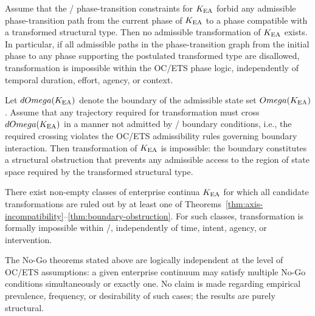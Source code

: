 \begin{theorem}
\label{thm:phase-incompatibility}
Assume that the \OC/ phase-transition constraints for $K_{\mathrm{EA}}$ forbid any
admissible phase-transition path from the current phase of $K_{\mathrm{EA}}$ to a phase
compatible with a transformed structural type. Then no admissible
transformation of $K_{\mathrm{EA}}$ exists. In particular, if all admissible paths in the
phase-transition graph from the initial phase to any phase supporting the
postulated transformed type are disallowed, transformation is impossible within
the OC/ETS phase logic, independently of temporal duration, effort, agency, or
context.
\end{theorem}

\begin{theorem}
\label{thm:boundary-obstruction}
Let $dOmega(K_{\mathrm{EA}})$ denote the boundary of the admissible state set $Omega(K_{\mathrm{EA}})$.
Assume that any trajectory required for transformation must cross $dOmega(K_{\mathrm{EA}})$
in a manner not admitted by \OC/ boundary conditions, i.e., the required
crossing violates the OC/ETS admissibility rules governing boundary interaction.
Then transformation of $K_{\mathrm{EA}}$ is impossible: the boundary constitutes a
structural obstruction that prevents any admissible access to the region of
state space required by the transformed structural type.
\end{theorem}

\begin{corollary}
There exist non-empty classes of enterprise continua $K_{\mathrm{EA}}$ for which all
candidate transformations are ruled out by at least one of
Theorems~\ref{thm:axis-incompatibility}--\ref{thm:boundary-obstruction}. For such
classes, transformation is formally impossible within \OC/,
independently of time, intent, agency, or intervention.
\end{corollary}

\begin{remark}
The No-Go theorems stated above are logically independent at the level of OC/ETS
assumptions: a given enterprise continuum may satisfy multiple No-Go conditions
simultaneously or exactly one. No claim is made regarding empirical prevalence,
frequency, or desirability of such cases; the results are purely structural.
\end{remark}
